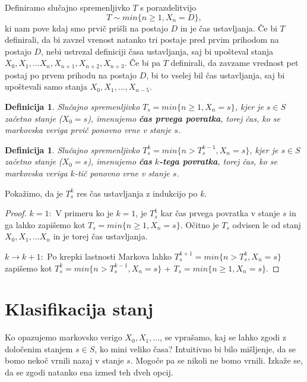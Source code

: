 \documentclass[a4paper,12pt]{article}
\newtheorem{definicija}[izrek]{Definicija}
\begin{document}
Definiramo slučajno spremenljivko $T$ s porazdelitvijo
$$
T \sim min\{n \ge 1, X_n = D\}
,
$$
ki nam pove kdaj smo prvič prišli na postajo $D$ in je čas ustavljanja. Če bi $T$ definirali, da bi zavzel vrenost natanko tri
postaje pred prvim prihodom na postajo $D$, nebi ustrezal definiciji časa ustavljanja, saj bi upošteval stanja $X_0, X_1, ... X_n, X_{n+1}, X_{n+2}, X_{n+3}.$
Če bi pa $T$ definirali, da zavzame vrednost pet postaj po prvem prihodu na postajo $D$, bi to vselej bil čas ustavljanja, saj bi upoštevali samo 
stanja $X_0, X_1, ..., X_{n-5}.$

\begin{definicija}
    Slučajno spremenljivko $T_s = min\{n \ge 1, X_n = s\}$, kjer je $s \in S$ začetno stanje ($X_0 = s$), imenujemo \textbf{čas prvega povratka}, 
    torej čas, ko se markovska veriga prvič ponovno vrne v stanje $s$. 
\end{definicija}

\begin{definicija}
    Slučajno spremenljivko $T^k_s = min\{ n > T^{k-1}_s, X_n = s\}$, kjer je $s \in S$ začetno stanje ($X_0 = s$), imenujemo \textbf{čas} $k$\textbf{-tega povratka}, 
    torej čas, ko se markovska veriga $k$-tič ponovno vrne v stanje $s$.
\end{definicija}

Pokažimo, da je $T^k_s$ res čas ustavljanja z indukcijo po $k$.

\begin{proof}
$k = 1:$
\newline
V primeru ko je $k = 1$, je $T^1_s$ kar čas prvega povratka v stanje $s$ in ga lahko zapišemo kot $T_s = min\{n \ge 1, X_n = s\}$. 
Očitno je $T_s$ odvisen le od stanj $X_0, X_1, ... X_n$ in je torej čas ustavljanja. 

$k \rightarrow k + 1:$
\newline
Po krepki lastnosti Markova lahko $T^{k + 1}_s = min\{ n > T^{k}_s, X_n = s\}$ zapišemo kot $T^k_s = min\{ n > T^{k - 1}_s, X_n = s\}$ + $T_s = min\{n \ge 1, X_n = s\}$.

\end{proof}




\newpage
\section{Klasifikacija stanj}

Ko opazujemo markovsko verigo $X_0, X_1, ...$, se vprašamo, kaj se lahko zgodi z določenim stanjem $s \in S$, ko mini veliko časa?
Intuitivno bi bilo mišljenje, da se bomo nekoč vrnili nazaj v stanje $s$. Mogoče pa se nikoli ne bomo vrnili.
Izkaže se, da se zgodi natanko ena izmed teh dveh opcij.
\end{document}
